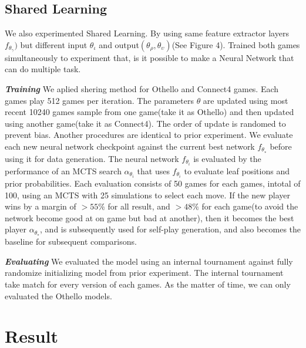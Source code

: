 \documentclass[12pt,a4paper]{article}
\begin{document}
\subsection{Shared Learning}
\hspace{0.6cm} We also experimented Shared Learning. By using same feature extractor layers \(f_{\theta_\gamma})\) but different input \(\theta_\iota\) and output\((\theta_\rho, \theta_\upsilon)\)(See Figure 4). Trained both games simultaneously to experiment that, is it possible to make a Neural Network that can do multiple task.\par
\textit{\textbf{Training}} We aplied shering method for Othello and Connect4 games. Each games play 512 games per iteration. The parameters \(\theta\) are updated using most recent 10240 games sample from one game(take it as Othello) and then updated using another game(take it as Connect4). The order of update is randomed to prevent bias. Another procedures are identical to prior experiment. We evaluate each new neural network checkpoint against the current best network \(f_{\theta_∗}\) before using it for data generation. The neural network \(f_{\theta_i}\) is evaluated by the performance of an MCTS search \(\alpha_{\theta_i}\) that uses \(f_{\theta_i}\) to evaluate leaf positions and prior probabilities. Each evaluation consists of 50 games for each games, intotal of 100, using an MCTS with 25 simulations to select each move. If the new player wins by a margin of \(> 55\%\) for all result, and \(> 48\%\) for each game(to avoid the network become good at on game but bad at another), then it becomes the best player \(\alpha_{\theta_∗}\), and is subsequently used for self-play generation, and also becomes the baseline for subsequent comparisons.\par
\textit{\textbf{Evaluating}} We evaluated the model using an internal tournament against fully randomize initializing model from prior experiment. The internal tournament take match for every version of each games. As the matter of time, we can only evaluated the Othello models.

\section{Result}
\end{document}
